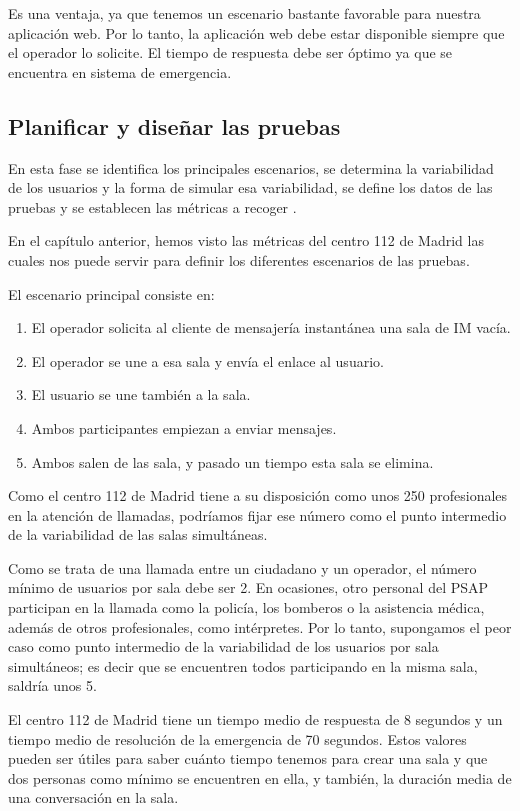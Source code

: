 Es una ventaja, ya que tenemos un escenario bastante favorable para nuestra aplicación web. Por lo tanto, la aplicación web debe estar disponible siempre que el operador lo solicite. El tiempo de respuesta debe ser óptimo ya que se encuentra en sistema de emergencia.

\subsection{Planificar y diseñar las pruebas}

En esta fase se identifica los principales escenarios, se determina la variabilidad de los usuarios y la forma de simular esa variabilidad, se define los datos de las pruebas y se establecen las métricas a recoger \cite{jmeter6}.

En el capítulo anterior, hemos visto las métricas del centro 112 de Madrid las cuales nos puede servir para definir los diferentes escenarios de las pruebas.

El escenario principal consiste en:

\begin{enumerate}
  \item El operador solicita al cliente de mensajería instantánea una sala de IM vacía.
  \item El operador se une a esa sala y envía el enlace al usuario.
  \item El usuario se une también a la sala.
  \item Ambos participantes empiezan a enviar mensajes.
  \item Ambos salen de las sala, y pasado un tiempo esta sala se elimina.
\end{enumerate}

Como el centro 112 de Madrid tiene a su disposición como unos 250 profesionales en la atención de llamadas, podríamos fijar ese número como el punto intermedio de la variabilidad de las salas simultáneas.

Como se trata de una llamada entre un ciudadano y un operador, el número mínimo de usuarios por sala debe ser 2. En ocasiones, otro personal del PSAP participan en la llamada como la policía, los bomberos o la asistencia médica, además de otros profesionales, como intérpretes. Por lo tanto, supongamos el peor caso como punto intermedio de la variabilidad de los usuarios por sala simultáneos; es decir que se encuentren todos participando en la misma sala, saldría unos 5.

El centro 112 de Madrid tiene un tiempo medio de respuesta de 8 segundos y un tiempo medio de resolución de la emergencia de 70 segundos. Estos valores pueden ser útiles para saber cuánto tiempo tenemos para crear una sala y que dos personas como mínimo se encuentren en ella, y también, la duración media de una conversación en la sala.

